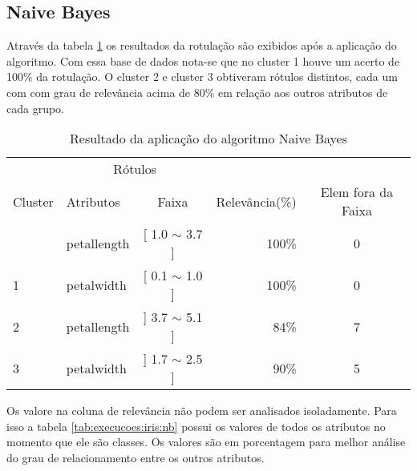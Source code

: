 \subsection{Naive Bayes} \label{cap:resultados:ssec:iris:nb}

Através da tabela \ref{tab:rot:iris:nb} os resultados da rotulação são exibidos após a aplicação do algoritmo. Com essa base de dados nota-se que no cluster 1 houve um acerto de 100\% da rotulação. O cluster 2 e cluster 3 obtiveram rótulos distintos, cada um com com grau de relevância acima de 80\% em relação aos outros atributos de cada grupo.

\begin{table}[!h]
\centering
\caption{Resultado da aplicação do algoritmo Naive Bayes}
\label{tab:rot:iris:nb}
\begin{tabular}{llcrc} \hline
 
\multicolumn{1}{c}{\cellcolor[HTML]{FFFFFF}} & \multicolumn{2}{c}{Rótulos}                & \multicolumn{1}{r}{}               & \\ \cline{2-3}
Cluster                                      & Atributos      & \multicolumn{1}{c}{Faixa} & \multicolumn{1}{c}{Relevância(\%)} & Elem fora da Faixa\\ \hline \hline
                                             & petallength    & [ 1.0 $\sim$  3.7 ]       & 100\%                               & 0 \\  
\multirow{-2}{*}{1}                          & petalwidth     & [ 0.1 $\sim$  1.0 ]       & 100\%                               & 0 \\  \hline
2                                             & petallength    & ] 3.7 $\sim$  5.1 ]       & 84\%                               & 7\\ \hline
3                                            & petalwidth     & ] 1.7 $\sim$  2.5 ]       & 90\%                               & 5\\ \hline \hline
\end{tabular}
\end{table}

Os valore na coluna de relevância não podem ser analisados isoladamente. Para isso  a tabela \ref{tab:execucoes:iris:nb} possui os valores de todos os atributos no momento que ele são classes. Os valores são em porcentagem para melhor análise do grau de relacionamento entre os outros atributos.

